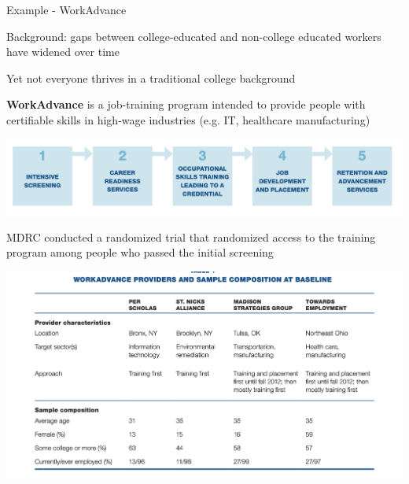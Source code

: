 \documentclass[11pt,english,handout]{beamer}
\newenvironment{wideitemize}{\itemize\addtolength{\itemsep}{10pt}}{\enditemize}
\begin{document}
\begin{frame}{Example - WorkAdvance}

\begin{wideitemize}
	
	\item 
	Background: gaps between college-educated and non-college educated workers have widened over time
	
	\item
	Yet not everyone thrives in a traditional college background
	
	\item
	\textbf{WorkAdvance} is a job-training program intended to provide people with certifiable skills in high-wage industries (e.g. IT, healthcare manufacturing)
	
	
	\includegraphics[width = 0.9 \linewidth]{workadvance-flow-chart}
	
	
	\item
	MDRC conducted a randomized trial that randomized access to the training program among people who passed the initial screening
	
\end{wideitemize}
\end{frame}

\begin{frame}
	\centering
	\includegraphics[width = 0.95 \linewidth]{workadvance-site-overview}
\end{frame}
\end{document}
